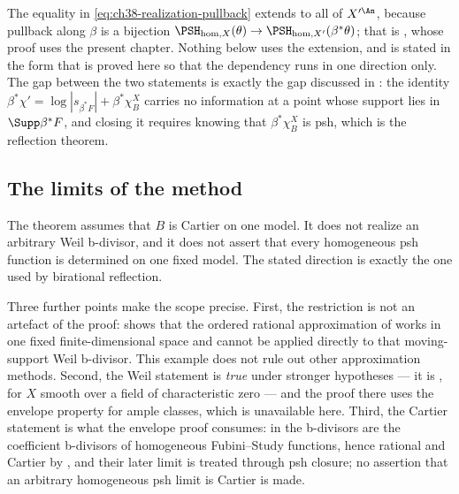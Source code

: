 \begin{remark}
\label{rem:ch38-pullback-forward}
The equality in \eqref{eq:ch38-realization-pullback} extends to all of
$X'^{\An}$, because pullback along $\beta$ is a bijection
$\PSH_{\mathrm{hom},X}(\theta)\to\PSH_{\mathrm{hom},X'}(\beta^*\theta)$;
that is , whose proof uses the present
chapter.  Nothing below  uses the extension, and
 is stated in the form that is proved
here so that the dependency runs in one direction only.  The gap between
the two statements is exactly the gap discussed in
: the identity
$\beta^*\chi'=\log|s_{\beta^*F}|+\beta^*\chi^X_B$ carries no information
at a point whose support lies in $\Supp\beta^*F$, and closing it requires
knowing that $\beta^*\chi^X_B$ is psh, which is the reflection theorem.
\end{remark}

\subsection{The limits of the method}
\label{sec:ch38-limits}

\begin{remark}
\label{rem:ch38-cartier-not-weil}
The theorem assumes that $B$ is Cartier on one model.  It does not realize
an arbitrary Weil b-divisor, and it does not assert that every homogeneous
psh function is determined on one fixed model.  The stated direction is
exactly the one used by birational reflection.

Three further points make the scope precise.  First, the restriction is not
an artefact of the proof:  shows that the
ordered rational approximation of 
works in one fixed finite-dimensional space and cannot be applied
directly to that moving-support Weil b-divisor. This example
does not rule out other approximation methods.  Second, the Weil statement is
\emph{true} under stronger hypotheses --- it is
, for $X$ smooth over a field of
characteristic zero --- and the proof there uses the envelope property for
ample classes, which is unavailable here.  Third, the Cartier statement is
what the envelope proof consumes: in
 the b-divisors are the coefficient b-divisors of
homogeneous Fubini--Study functions, hence rational and Cartier by
, and their later limit is treated through psh closure; no
assertion that an arbitrary homogeneous psh limit is Cartier is made.
\end{remark}

